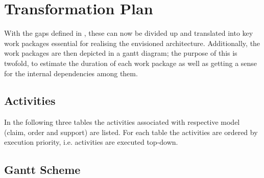 \section{Transformation Plan}
\label{sec:transformation_plan}
With the gaps defined in , these can now be divided up and translated into key work packages essential for realising the envisioned architecture. Additionally, the work packages are then depicted in a gantt diagram; the purpose of this is twofold,  to estimate the duration of each work package as well as getting a sense for the internal dependencies among them.
%
\subsection{Activities}
In the following three tables the activities associated with respective model (claim, order and support) are listed. For each table the activities are ordered by execution priority, i.e. activities are executed top-down.


\subsection{Gantt Scheme}

